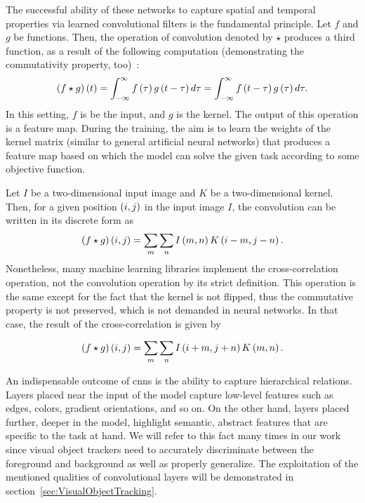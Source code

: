 The successful ability of these networks to capture spatial and temporal properties via learned convolutional filters is the fundamental principle. Let $f$ and $g$ be functions. Then, the operation of convolution denoted by $\star$ produces a third function, as a result of the following computation (demonstrating the commutativity property, too)~\cite{Goodfellow-et-al-2016}:
\begin{equation}
    \label{eq:ConvolutionContinuous}
    {\left( {f \star g} \right)} \left( t \right) =
    \int_{-\infty}^{\infty}
    {f} \left( \tau \right)
    {g} \left( t - \tau \right)
    d\tau =
    \int_{-\infty}^{\infty}
    {f} \left( t -\tau \right)
    {g} \left( \tau \right)
    d\tau.
\end{equation}
In this setting, $f$ is be the input, and $g$ is the kernel. The output of this operation is a feature map. During the training, the aim is to learn the weights of the kernel matrix (similar to general artificial neural networks) that produces a feature map based on which the model can solve the given task according to some objective function.

Let $I$ be a two-dimensional input image and $K$ be a two-dimensional kernel. Then, for a given position $\left( {i, j} \right)$ in the input image $I$, the convolution can be written in its discrete form as
\begin{equation}
    \label{eq:ConvolutionDiscrete}
    {\left( {f \star g} \right)} \left( i, j \right) =
    \sum_{m}
    \sum_{n}
    {I} \left( m, n \right)
    {K} \left( i - m, j - n \right).
\end{equation}
Nonetheless, many machine learning libraries implement the cross-correlation operation, not the convolution operation by its strict definition. This operation is the same except for the fact that the kernel is not flipped, thus the commutative property is not preserved, which is not demanded in neural networks. In that case, the result of the cross-correlation is given by~\cite{Goodfellow-et-al-2016}

\begin{equation}
    \label{eq:CrossCorrelation}
    {\left( {f \star g} \right)} \left( i, j \right) =
    \sum_{m}
    \sum_{n}
    {I} \left( i + m, j + n \right)
    {K} \left( m, n \right).
\end{equation}

An indispensable outcome of \glspl{cnn} is the ability to capture hierarchical relations. Layers placed near the input of the model capture low-level features such as edges, colors, gradient orientations, and so on. On the other hand, layers placed further, deeper in the model, highlight semantic, abstract features that are specific to the task at hand. We will refer to this fact many times in our work since visual object trackers need to accurately discriminate between the foreground and background as well as properly generalize. The exploitation of the mentioned qualities of convolutional layers will be demonstrated in section~\ref{sec:VisualObjectTracking}.

